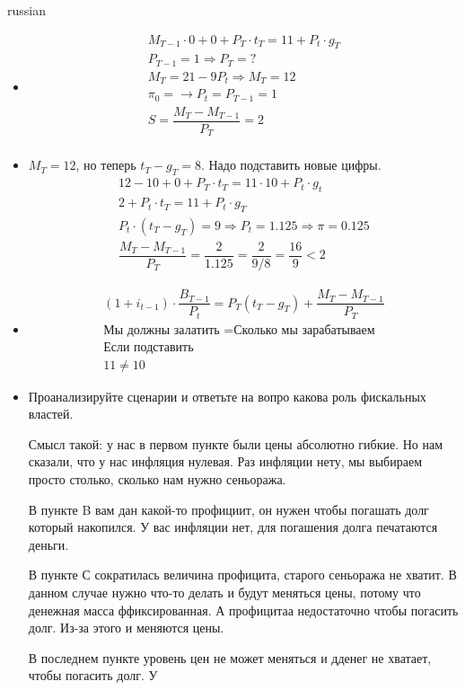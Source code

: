 \documentclass{article}
\begin{document}
\begin{otherlanguage*}{russian}
\begin{itemize}
\item 
\begin{align*}
M_{T-1} \cdot 0 + 0 + P_{T} \cdot t_T = 11 + P_t \cdot g_T \\
P_{T-1} = 1 \Rightarrow P_T = ? \\
M_T = 21 - 9 P_t \Rightarrow M_T = 12 \\
\pi_0 = \rightarrow P_t = P_{T-1} = 1 \\
S = \dfrac{M_T - M_{T-1}}{P_T} = 2 \\
\end{align*}
\item $ M_T = 12 $, но теперь $ t_T - g_T = 8 $. Надо подставить новые цифры. 
\begin{align*}
12 - 10 + 0 + P_T \cdot t_T = 11 \cdot 10 + P_t \cdot g_t  \\
2 + P_t \cdot t_T = 11 + P_t \cdot g_T \\
P_t \cdot (t_T - g_T ) = 9 \Rightarrow P_t = 1.125 \Rightarrow \pi = 0.125 \\
\dfrac{M_T - M_{T-1}}{P_T} = \dfrac{2}{1.125} = \dfrac{2}{9/8} = \dfrac{16}{9} < 2 
\end{align*}
\item 
\begin{align*}
(1 + i_{t-1} ) \cdot \dfrac{B_{T-1}}{P_t} = P_T (t_T - g_T) + \dfrac{M_T - M_{T-1}}{P_T} \\
\text{Мы должны залатить } = \text{Сколько мы зарабатываем} \\
\text{Если подставить} \\
11 \ne 10 
\end{align*}
\item Проанализируйте сценарии и ответьте на вопро какова роль фискальных властей. 

Смысл такой: у нас в первом пункте были цены абсолютно гибкие. Но нам сказали, что у нас инфляция нулевая. Раз инфляции нету, мы выбираем просто столько, сколько нам нужно сеньоража. 

В пункте B вам дан какой-то профициит, он нужен чтобы погашать долг который накопился. У вас инфляции нет, для погашения долга печатаются деньги.

В пункте С сократилась величина профицита, старого сеньоража не хватит. В данном случае нужно что-то делать и будут меняться цены, потому что денежная масса ффиксированная. А профицитаа недостаточно чтобы погасить долг. Из-за этого и меняются цены.

В последнем пункте уровень цен не может меняться и дденег не хватает, чтобы погасить долг. У 
\end{itemize}
\end{otherlanguage*} 
\end{document}
